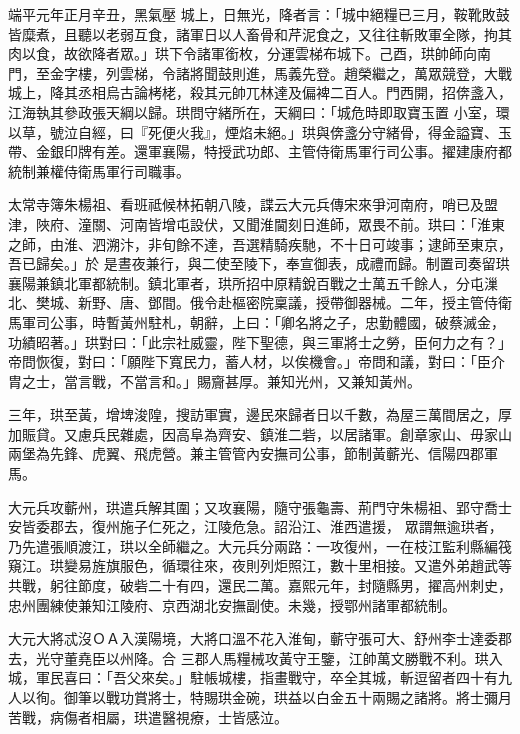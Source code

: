 \begin{pinyinscope}
 端平元年正月辛丑，黑氣壓
 城上，日無光，降者言：「城中絕糧已三月，鞍靴敗鼓皆糜煮，且聽以老弱互食，諸軍日以人畜骨和芹泥食之，又往往斬敗軍全隊，拘其肉以食，故欲降者眾。」珙下令諸軍銜枚，分運雲梯布城下。己酉，珙帥師向南門，至金字樓，列雲梯，令諸將聞鼓則進，馬義先登。趙榮繼之，萬眾競登，大戰城上，降其丞相烏古論栲栳，殺其元帥兀林達及偏裨二百人。門西開，招倴盞入，江海執其參政張天綱以歸。珙問守緒所在，天綱曰：「城危時即取寶玉置
 小室，環以草，號泣自經，曰『死便火我』，煙焰未絕。」珙與倴盞分守緒骨，得金謚寶、玉帶、金銀印牌有差。還軍襄陽，特授武功郎、主管侍衛馬軍行司公事。擢建康府都統制兼權侍衛馬軍行司職事。



 太常寺簿朱楊祖、看班祗候林拓朝八陵，諜云大元兵傳宋來爭河南府，哨已及盟津，陜府、潼關、河南皆增屯設伏，又聞淮閫刻日進師，眾畏不前。珙曰：「淮東之師，由淮、泗溯汴，非旬餘不達，吾選精騎疾馳，不十日可竣事；逮師至東京，吾已歸矣。」於
 是晝夜兼行，與二使至陵下，奉宣御表，成禮而歸。制置司奏留珙襄陽兼鎮北軍都統制。鎮北軍者，珙所招中原精銳百戰之士萬五千餘人，分屯漅北、樊城、新野、唐、鄧間。俄令赴樞密院稟議，授帶御器械。二年，授主管侍衛馬軍司公事，時暫黃州駐札，朝辭，上曰：「卿名將之子，忠勤體國，破蔡滅金，功績昭著。」珙對曰：「此宗社威靈，陛下聖德，與三軍將士之勞，臣何力之有？」帝問恢復，對曰：「願陛下寬民力，蓄人材，以俟機會。」帝問和議，對曰：「臣介
 胄之士，當言戰，不當言和。」賜齎甚厚。兼知光州，又兼知黃州。



 三年，珙至黃，增埤浚隍，搜訪軍實，邊民來歸者日以千數，為屋三萬間居之，厚加賑貸。又慮兵民雜處，因高阜為齊安、鎮淮二砦，以居諸軍。創章家山、毋家山兩堡為先鋒、虎翼、飛虎營。兼主管管內安撫司公事，節制黃蘄光、信陽四郡軍馬。



 大元兵攻蘄州，珙遣兵解其圍；又攻襄陽，隨守張龜壽、荊門守朱楊祖、郢守喬士安皆委郡去，復州施子仁死之，江陵危急。詔沿江、淮西遣援，
 眾謂無逾珙者，乃先遣張順渡江，珙以全師繼之。大元兵分兩路：一攻復州，一在枝江監利縣編筏窺江。珙變易旌旗服色，循環往來，夜則列炬照江，數十里相接。又遣外弟趙武等共戰，躬往節度，破砦二十有四，還民二萬。嘉熙元年，封隨縣男，擢高州刺史，忠州團練使兼知江陵府、京西湖北安撫副使。未幾，授鄂州諸軍都統制。



 大元大將忒沒ＯＡ入漢陽境，大將口溫不花入淮甸，蘄守張可大、舒州李士達委郡去，光守董堯臣以州降。合
 三郡人馬糧械攻黃守王鑒，江帥萬文勝戰不利。珙入城，軍民喜曰：「吾父來矣。」駐帳城樓，指畫戰守，卒全其城，斬逗留者四十有九人以徇。御筆以戰功賞將士，特賜珙金碗，珙益以白金五十兩賜之諸將。將士彌月苦戰，病傷者相屬，珙遣醫視療，士皆感泣。




\end{pinyinscope}
